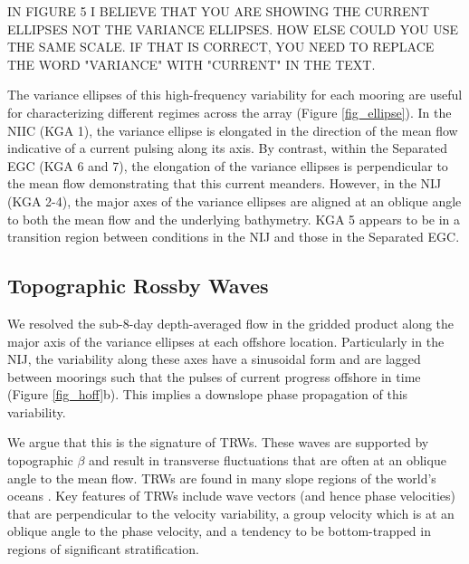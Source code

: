 \documentclass[12pt,titlepage,figuresatend]{article}
\begin{document}
IN FIGURE 5 I BELIEVE THAT YOU ARE SHOWING THE CURRENT ELLIPSES NOT THE VARIANCE ELLIPSES. HOW ELSE COULD YOU USE THE SAME SCALE. IF THAT IS CORRECT, YOU NEED TO REPLACE THE WORD "VARIANCE" WITH "CURRENT" IN THE TEXT. 

The variance ellipses of this high-frequency variability for each mooring are useful for characterizing different regimes across the array (Figure \ref{fig_ellipse}). In the NIIC (KGA 1), the variance ellipse is elongated in the direction of the mean flow indicative of a current pulsing along its axis. By contrast, within the Separated EGC (KGA 6 and 7), the elongation of the variance ellipses is perpendicular to the mean flow demonstrating that this current meanders. However, in the NIJ (KGA 2-4), the major axes of the variance ellipses are aligned at an oblique angle to both the mean flow and the underlying bathymetry. KGA 5 appears to be in a transition region between conditions in the NIJ and those in the Separated EGC.


\subsection{Topographic Rossby Waves}
\label{TRWsec}

We resolved the sub-8-day depth-averaged flow in the gridded product along the major axis of the variance ellipses at each offshore location. Particularly in the NIJ, the variability along these axes have a sinusoidal form and are lagged between moorings such that the pulses of current progress offshore in time (Figure \ref{fig_hoff}b). This implies a downslope phase propagation of this variability.

We argue that this is the signature of TRWs. These waves are supported by topographic $\beta$ and result in transverse fluctuations that are often at an oblique angle to the mean flow. TRWs are found in many slope regions of the world’s oceans \cite[]{Garrett1979,Louis1982,Pickart1990}. Key features of TRWs include wave vectors (and hence phase velocities) that are perpendicular to the velocity variability, a group velocity which is at an oblique angle to the phase velocity, and a tendency to be bottom-trapped in regions of significant stratification.
\end{document}
